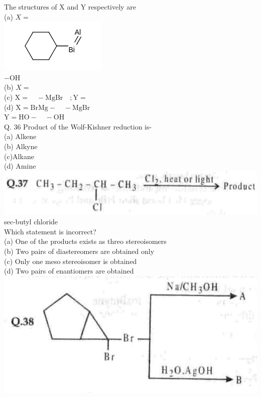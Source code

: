 \documentclass[10pt]{article}
\begin{document}
The structures of X and Y respectively are\\
(a) $X=$\\
\includegraphics{smile-432fc4eea088c0c3572ad71d4d7fbf146a48cd37}\\
$-\mathrm{OH}$\\
(b) $X=$\\
(c) $\mathrm{X}=\quad-\mathrm{MgBr} \quad ; \mathrm{Y}=$\\
(d) $\mathrm{X}=\mathrm{BrMg}-\quad-\mathrm{MgBr}$\\
$\mathrm{Y}=\mathrm{HO}-\quad-\mathrm{OH}$\\
Q. 36 Product of the Wolf-Kishner reduction is-\\
(a) Alkene\\
(b) Alkyne\\
(c)Alkane\\
(d) Amine\\
\includegraphics[max width=\textwidth, center]{2025_01_28_8470952b98110cec3aabg-232(1)}\\
sec-butyl chloride\\
Which statement is incorrect?\\
(a) One of the products exists as threo stereoisomers\\
(b) Two pairs of diastereomers are obtained only\\
(c) Only one meso stereoisomer is obtained\\
(d) Two pairs of enantiomers are obtained\\
\includegraphics[max width=\textwidth, center]{2025_01_28_8470952b98110cec3aabg-232(2)}\\
\end{document}
